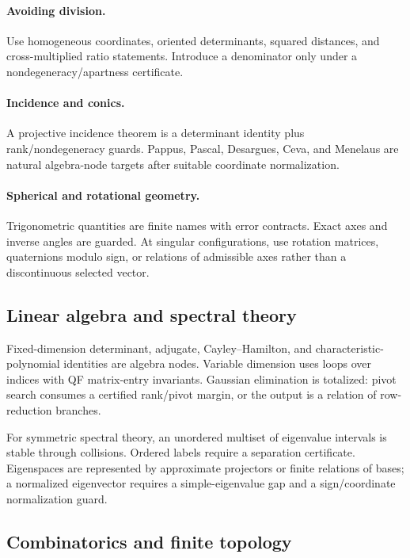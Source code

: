 \paragraph{Avoiding division.}
Use homogeneous coordinates, oriented determinants, squared distances, and cross-multiplied ratio statements.  Introduce a denominator only under a nondegeneracy/apartness certificate.

\paragraph{Incidence and conics.}
A projective incidence theorem is a determinant identity plus rank/nondegeneracy guards.  Pappus, Pascal, Desargues, Ceva, and Menelaus are natural algebra-node targets after suitable coordinate normalization.

\paragraph{Spherical and rotational geometry.}
Trigonometric quantities are finite names with error contracts.  Exact axes and inverse angles are guarded.  At singular configurations, use rotation matrices, quaternions modulo sign, or relations of admissible axes rather than a discontinuous selected vector.

\subsection{Linear algebra and spectral theory}

Fixed-dimension determinant, adjugate, Cayley--Hamilton, and characteristic-polynomial identities are algebra nodes.  Variable dimension uses loops over indices with QF matrix-entry invariants.  Gaussian elimination is totalized: pivot search consumes a certified rank/pivot margin, or the output is a relation of row-reduction branches.

For symmetric spectral theory, an unordered multiset of eigenvalue intervals is stable through collisions.  Ordered labels require a separation certificate.  Eigenspaces are represented by approximate projectors or finite relations of bases; a normalized eigenvector requires a simple-eigenvalue gap and a sign/coordinate normalization guard.

\subsection{Combinatorics and finite topology}

